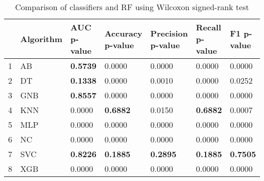 \begin{table}
\footnotesize
\caption{Comparison of classifiers and RF using Wilcoxon signed-rank test}
\label{tab:wilcoxon comparison}
\begin{tabular}{lllllll}
\hline
 & Algorithm & AUC p-value & Accuracy p-value & Precision p-value & Recall p-value & F1 p-value \\
\hline
1 & AB & \textbf{0.5739} & 0.0000 & 0.0000 & 0.0000 & 0.0000 \\
2 & DT & \textbf{0.1338} & 0.0000 & 0.0010 & 0.0000 & 0.0252 \\
3 & GNB & \textbf{0.8557} & 0.0000 & 0.0000 & 0.0000 & 0.0000 \\
4 & KNN & 0.0000 & \textbf{0.6882} & 0.0150 & \textbf{0.6882} & 0.0007 \\
5 & MLP & 0.0000 & 0.0000 & 0.0000 & 0.0000 & 0.0000 \\
6 & NC & 0.0000 & 0.0000 & 0.0000 & 0.0000 & 0.0000 \\
7 & SVC & \textbf{0.8226} & \textbf{0.1885} & \textbf{0.2895} & \textbf{0.1885} & \textbf{0.7505} \\
8 & XGB & 0.0000 & 0.0000 & 0.0000 & 0.0000 & 0.0000 \\
\hline
\end{tabular}
\end{table}
